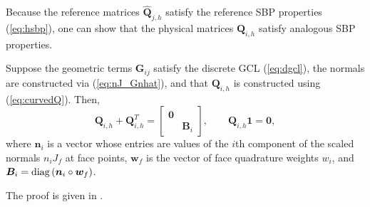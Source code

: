 \documentclass{svjour3}                     %
\renewcommand{\hat}{\widehat}
\newcommand{\diag}[1]{{\rm diag}\LRp{#1}}
\newcommand{\LRp}[1]{\left( #1 \right)}
\newcommand{\LRs}[1]{\left[ #1 \right]}
\begin{document}
Because the reference matrices $\hat{\bm{Q}}_{j,h}$ satisfy the reference SBP properties (\ref{eq:hsbp}), one can show \cite{chan2018discretely} that the physical matrices $\bm{Q}_{i,h}$ satisfy analogous SBP properties.  
\begin{lemma}
\label{lemma:Qhprops}
Suppose the geometric terms $\bm{G}_{ij}$ satisfy the discrete GCL (\ref{eq:dgcl}), the normals are constructed via (\ref{eq:nJ_Gnhat}), and that $\bm{Q}_{i,h}$ is constructed using (\ref{eq:curvedQ}).  Then, 
\[
\bm{Q}_{i,h} + \bm{Q}_{i,h}^T = \begin{bmatrix}
\bm{0} &\\
& \bm{B}_i \end{bmatrix}, \qquad \bm{Q}_{i,h}\bm{1} = \bm{0},
\]
where $\bm{n}_i$ is a vector whose entries are values of the $i$th component of the scaled normals $n_iJ_f$ at face points, $\bm{w}_f$ is the vector of face quadrature weights $w_i$, and $\bm{B}_i = \diag{\bm{n}_i \circ \bm{w}_f}$.
\end{lemma}
The proof is given in \cite{chan2018discretely}.  
%
\end{document}
